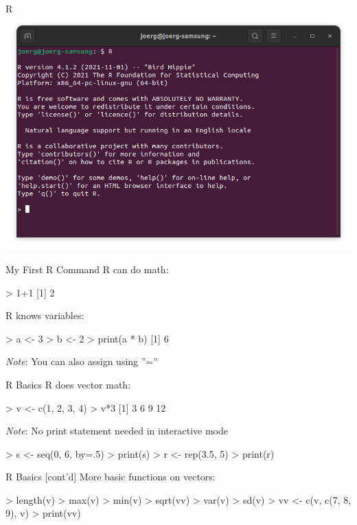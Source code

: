 \documentclass[ignorenonframetext,xcolor=x11names]{beamer}
\begin{document}
\begin{frame}{R}
\centering
\includegraphics[width=\textwidth]{screen1.png}
\end{frame}

\begin{frame}[fragile]{My First R Command}
R can do math:
\begin{Rcode}
> 1+1
[1] 2
\end{Rcode}
R knows variables:
\begin{Rcode}
> a <- 3
> b <- 2
> print(a * b)
[1] 6
\end{Rcode}
\emph{Note}: You can also assign using ''=''
\end{frame}

\begin{frame}[fragile]{R Basics}
R does vector math:
\begin{Rcode}
> v <- c(1, 2, 3, 4)
> v*3
[1]  3  6  9 12
\end{Rcode}
\emph{Note}: No print statement needed in interactive mode\\

\begin{Rcode}
> s <- seq(0, 6, by=.5)
> print(s)
> r <- rep(3.5, 5)
> print(r)
\end{Rcode}
\end{frame}

\begin{frame}[fragile]{R Basics \small [cont'd]}
More basic functions on vectors:
\begin{Rcode}
> length(v)
> max(v)
> min(v)
> sqrt(vv)
> var(v)
> sd(v)
> vv <- c(v, c(7, 8, 9), v)
> print(vv)
\end{Rcode}
\end{frame}
\end{document}
